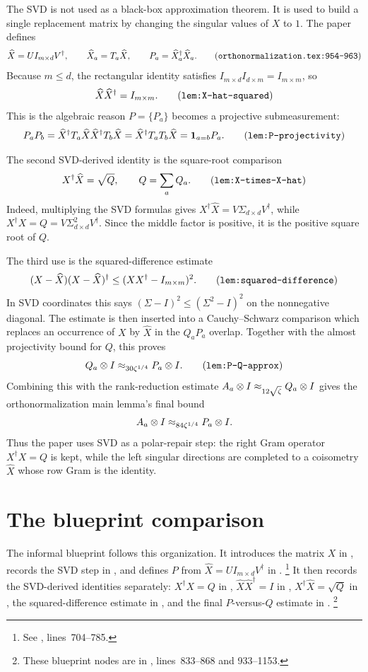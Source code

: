 \documentclass[11pt]{article}
\begin{document}
The SVD is not used as a black-box approximation theorem.  It is used to build a
single replacement matrix by changing the singular values of $X$ to $1$.  The
paper defines
\[
  \widehat X = U I_{m\times d} V^\dagger,
  \qquad
  \widehat X_a = T_a\widehat X,
  \qquad
  P_a = \widehat X_a^\dagger \widehat X_a.
  \tag{\texttt{orthonormalization.tex:954--963}}
\]
Because $m\le d$, the rectangular identity satisfies
$I_{m\times d}I_{d\times m}=I_{m\times m}$, so
\[
  \widehat X\widehat X^\dagger = I_{m\times m}.
  \tag{\texttt{lem:X-hat-squared}}
\]
This is the algebraic reason $P=\{P_a\}$ becomes a projective submeasurement:
\[
  P_aP_b
  = \widehat X^\dagger T_a\widehat X\widehat X^\dagger T_b\widehat X
  = \widehat X^\dagger T_aT_b\widehat X
  = \mathbf 1_{a=b}P_a.
  \tag{\texttt{lem:P-projectivity}}
\]

The second SVD-derived identity is the square-root comparison
\[
  X^\dagger \widehat X = \sqrt Q,
  \qquad Q=\sum_a Q_a.
  \tag{\texttt{lem:X-times-X-hat}}
\]
Indeed, multiplying the SVD formulas gives
$X^\dagger\widehat X=V\Sigma_{d\times d}V^\dagger$, while
$X^\dagger X=Q=V\Sigma_{d\times d}^2V^\dagger$.  Since the middle factor is
positive, it is the positive square root of $Q$.

The third use is the squared-difference estimate
\[
  (X-\widehat X)(X-\widehat X)^\dagger
  \le (XX^\dagger-I_{m\times m})^2.
  \tag{\texttt{lem:squared-difference}}
\]
In SVD coordinates this says
$(\Sigma-I)^2\le (\Sigma^2-I)^2$ on the nonnegative diagonal.  The estimate is
then inserted into a Cauchy--Schwarz comparison which replaces an occurrence of
$X$ by $\widehat X$ in the $Q_aP_a$ overlap.  Together with the almost
projectivity bound for $Q$, this proves
\[
  Q_a\ot I \approx_{30\zeta^{1/4}} P_a\ot I.
  \tag{\texttt{lem:P-Q-approx}}
\]
Combining this with the rank-reduction estimate
$A_a\otimes I\approx_{12\sqrt\zeta} Q_a\otimes I$ gives the orthonormalization main
lemma's final bound
\[
  A_a\otimes I \approx_{84\zeta^{1/4}} P_a\otimes I.
\]
Thus the paper uses SVD as a polar-repair step: the right Gram operator
$X^\dagger X=Q$ is kept, while the left singular directions are completed to a
coisometry $\widehat X$ whose row Gram is the identity.

\section{The blueprint comparison}

The informal blueprint follows this organization.  It introduces the matrix
$X$ in , records the SVD step in
, and defines $P$ from
$\widehat X=UI_{m\times d}V^\dagger$ in .%
\footnote{See , lines~704--785.}
It then records the SVD-derived identities separately: $X^\dagger X=Q$ in
, $\widehat X\widehat X^\dagger=I$ in
, $X^\dagger\widehat X=\sqrt Q$ in
, the squared-difference estimate in
, and the final $P$-versus-$Q$ estimate in
.%
\footnote{These blueprint nodes are in
, lines~833--868 and
933--1153.}
\end{document}

